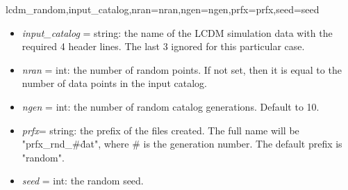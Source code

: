 \begin{center}
    lcdm\_random,input\_catalog,nran=nran,ngen=ngen,prfx=prfx,seed=seed
\end{center}
\begin{itemize}
\item {\em  input\_catalog }= string: the name of the LCDM simulation data 
                       with the required 4 header lines. The last 3 ignored 
		       for this particular case. 
\item {\em  nran }= int: the number of random points. If not set, then it is
              equal to the number of data points in the input catalog.
\item {\em  ngen }= int: the number of random catalog generations. Default to
              10.
 \item {\em  prfx}= string: the prefix of the files created. The full name 
will be "prfx\_rnd\_\#\.dat", where \# is the generation number. The
default prefix is "random".
\item {\em  seed }= int:  the random seed.
\end{itemize}
 
 

